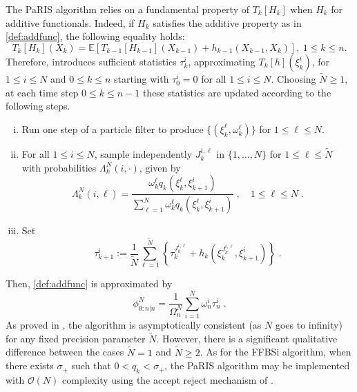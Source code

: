 \documentclass[12pt,draft]{article}
\newcommand{\eqsp}{\;}
\newcommand{\1}{\mathrm{1}}
\newcommand{\qk}{q_{k}}
\begin{document}
The PaRIS algorithm relies on a fundamental property of $T_k[H_k]$ when $H_k$ for additive functionals. Indeed, if $H_k$ satisfies the additive property as in \eqref{def:addfunc}, the following equality holds:
\begin{equation}
T_k[H_k](X_k)=\mathbb{E}\left[T_{k-1}[H_{k-1}](X_{k-1}) + h_{k-1}(X_{k-1},X_k) \right],~1\leq k\leq n.
\end{equation}
Therefore, \cite{olsson:westerborn:2016} introduces sufficient statistics $\tau^i_k$, approximating $T_k[h](\xi^i_k)$, for $1\le i\le N$ and $0\le k \le n$ starting with $\tau^i_0 = 0$ for all $1\le i\le N$. Choosing $\tilde{N}\ge 1$, at each time step $0\le k \le {n-1}$ these statistics are updated according to the following steps.
\begin{enumerate}[(i)]
\item \label{it:PaRIS:filt} Run one step of a particle filter to produce $\{(\xi^{\ell}_k, \omega^{\ell}_k)\}$ for $1\le \ell \le N$.
\item \label{it:PaRIS:sampleindex} For all $1\le i \le N$, sample independently $J_{k}^{i,\ell}$ in $\{1,\ldots,N\}$ for $1\le \ell \le \widetilde N$ with probabilities $\Lambda_{k}^N(i,\cdot)$, given by
\[
\Lambda_{k}^N(i,\ell) = \frac{\omega^{\ell}_{k} \qk(\xi^{\ell}_{k},\xi_{k+1}^{i})}{\sum_{\ell=1}^N\omega^{\ell}_{k} \qk(\xi^{\ell}_{k},\xi_{k+1}^{i})}\eqsp,\quad 1\le \ell\le N\eqsp.
\]
\item \label{it:PaRIS:smooth} Set
\[
\tau^{i}_{k+1} := \frac{1}{\widetilde{N}} \sum^{\widetilde{N}}_{\ell=1} \left\{ \tau^{J_{k}^{i,\ell}}_{k} + h_{k} \left(\xi^{J_{k}^{i,\ell}}_{k}, \xi^{i}_{k+1}\right)  \right\}\eqsp.
\]
\end{enumerate}
Then, \eqref{def:addfunc} is approximated by
\[
\phi_{0:n\vert n}^N = \frac{1}{\Omega_n^N}\sum_{i=1}^N \omega^{i}_n \tau_n^i\eqsp.
\] 
As proved in \cite{olsson:westerborn:2016}, the algorithm is asymptotically consistent (as $N$ goes to infinity) for any fixed precision parameter $\tilde N$. However, there is a significant qualitative difference between the cases $\tilde{N} = 1$ and $\tilde{N} \geq 2$. As for the FFBSi algorithm,  when there exists $\sigma_+$ such that $0<\qk <\sigma_+$, the PaRIS algorithm may be implemented with $\mathcal{O}(N)$ complexity using the accept reject mechanism of \cite{douc:garivier:moulines:olsson:2011}.
\end{document}
